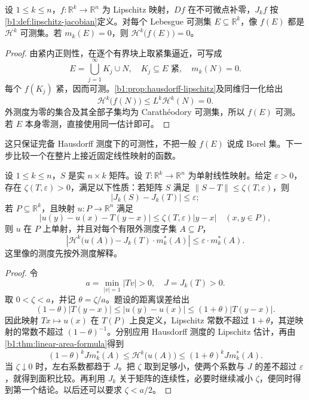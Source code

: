 \begin{lemma}\label{b1:lem:lipschitz-image-hausdorff-measurable}
设 \(1\le k\le n\)，\(f:\mathbb R^k\to\mathbb R^n\) 为 Lipschitz 映射，\(Df\) 在不可微点补零，\(J_kf\) 按\cref{b1:def:lipschitz-jacobian}定义。对每个 Lebesgue 可测集 \(E\subseteq\mathbb R^k\)，像 \(f(E)\) 都是 \(\mathcal H^k\) 可测集。若 \(m_k(E)=0\)，则 \(\mathcal H^k\bigl(f(E)\bigr)=0\)。
\end{lemma}
\begin{proof}
由紧内正则性，在逐个有界块上取紧集逼近，可写成
\[
 E=\bigcup_{j=1}^{\infty}K_j\cup N,
 \quad K_j\subseteq E\text{ 紧},\quad m_k(N)=0.
\]
每个 \(f(K_j)\) 紧，因而可测。\cref{b1:prop:hausdorff-lipschitz}及同维归一化给出
\[
 \mathcal H^k\bigl(f(N)\bigr)\leq L^k\mathcal H^k(N)=0.
\]
外测度为零的集合及其全部子集均为 Carathéodory 可测集，所以 \(f(E)\) 可测。若 \(E\) 本身零测，直接使用同一估计即可。
\end{proof}

这只保证完备 Hausdorff 测度下的可测性，不把一般 \(f(E)\) 说成 Borel 集。下一步比较一个在整片上接近固定线性映射的函数。

\begin{lemma}\label{b1:lem:near-linear-area-comparison}
设 \(1\le k\le n\)，\(S\) 是实 \(n\times k\) 矩阵。设 \(T:\mathbb R^k\rightarrow\mathbb R^n\) 为单射线性映射。给定 \(\varepsilon>0\)，存在 \(\zeta(T,\varepsilon)>0\)，满足以下性质：若矩阵 \(S\) 满足 \(\|S-T\|\leq\zeta(T,\varepsilon)\)，则
\[
 |J_k(S)-J_k(T)|\leq\varepsilon;
\]
若 \(P\subseteq\mathbb R^k\)，且映射 \(u:P\rightarrow\mathbb R^n\) 满足
\[
 |u(y)-u(x)-T(y-x)|
 \leq\zeta(T,\varepsilon)|y-x|\quad(x,y\in P),
\]
则 \(u\) 在 \(P\) 上单射，并且对每个有限外测度子集 \(A\subseteq P\)，
\[
 \left|\mathcal H^k\bigl(u(A)\bigr)-J_k(T)\cdot m_k^*(A)\right|
 \leq\varepsilon\cdot m_k^*(A).
\]
这里像的测度先按外测度解释。
\end{lemma}
\begin{proof}
令
\[
 a=\min_{|v|=1}|Tv|>0,\quad J=J_k(T)>0.
\]
取 \(0<\zeta<a\)，并记 \(\theta=\zeta/a\)。题设的距离误差给出
\[
 (1-\theta)|T(y-x)|
 \leq|u(y)-u(x)|
 \leq(1+\theta)|T(y-x)|.
\]
因此映射 \(Tx\mapsto u(x)\) 在 \(T(P)\) 上良定义，Lipschitz 常数不超过 \(1+\theta\)，其逆映射的常数不超过 \((1-\theta)^{-1}\)。分别应用 Hausdorff 测度的 Lipschitz 估计，再由\cref{b1:thm:linear-area-formula}得到
\[
 (1-\theta)^kJm_k^*(A)
 \leq\mathcal H^k\bigl(u(A)\bigr)
 \leq(1+\theta)^kJm_k^*(A).
\]
当 \(\zeta\downarrow0\) 时，左右系数都趋于 \(J\)。把 \(\zeta\) 取到足够小，使两个系数与 \(J\) 的差不超过 \(\varepsilon\)，就得到面积比较。再利用 \(J_k\) 关于矩阵的连续性，必要时继续减小 \(\zeta\)，便同时得到第一个结论。以后还可以要求 \(\zeta<a/2\)。
\end{proof}

